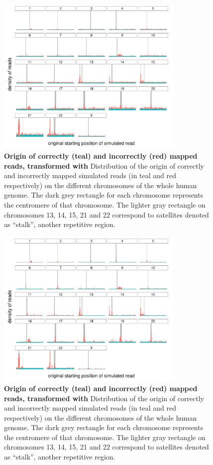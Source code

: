 \documentclass[
  11pt,
  twoside]{scrbook}
\newcommand{\extcaption}[2]{
    \caption[#1]{
        \textbf{#1}\newline
        #2
    }
}
\begin{document}
\begin{figure}[H]
    \centering
    \includegraphics[width=0.8\textwidth]{figures/HPC-MSRs/msr_e_distrib.centro.pdf}
    \extcaption{Origin of correctly (teal) and incorrectly (red) mapped reads, transformed with \msr{E}}{Distribution of the origin of correctly and incorrectly mapped simulated reads (in teal and red respectively) on the different chromosomes of the whole human genome. The dark grey rectangle for each chromosome represents the centromere of that chromosome. The lighter gray rectangle on chromosomes 13, 14, 15, 21 and 22 correspond to satellites denoted as ``stalk'', another repetitive region.}
    \label{fig:hist-msr-e}
\end{figure}

\begin{figure}[H]
    \centering
    \includegraphics[width=0.8\textwidth]{figures/HPC-MSRs/msr_p_distrib.centro.pdf}
    \extcaption{Origin of correctly (teal) and incorrectly (red) mapped reads, transformed with \msr{P}}{Distribution of the origin of correctly and incorrectly mapped simulated reads (in teal and red respectively) on the different chromosomes of the whole human genome. The dark grey rectangle for each chromosome represents the centromere of that chromosome. The lighter gray rectangle on chromosomes 13, 14, 15, 21 and 22 correspond to satellites denoted as ``stalk'', another repetitive region.}
    \label{fig:hist-msr-p}
\end{figure}
\end{document}

